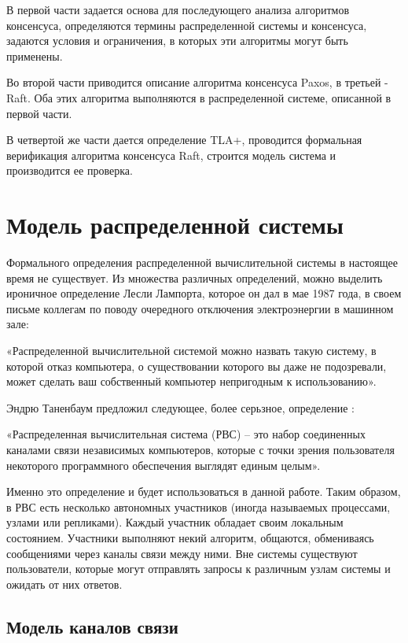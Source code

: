 
В первой части задается основа для последующего анализа алгоритмов консенсуса,
определяются термины распределенной системы и консенсуса, задаются условия и
ограничения, в которых эти алгоритмы могут быть применены.

Во второй части приводится описание алгоритма консенсуса Paxos, в третьей - Raft.
Оба этих алгоритма выполняются в распределенной системе, описанной в первой части.

В четвертой же части дается определение TLA+, проводится формальная верификация
алгоритма консенсуса Raft, строится модель система и производится ее проверка.

\section{Модель распределенной системы}

Формального определения распределенной вычислительной системы в настоящее время
не существует. Из множества различных определений, можно выделить ироничное
определение Лесли Лампорта, которое он дал в мае 1987 года,
в своем письме коллегам по поводу очередного отключения электроэнергии в машинном
зале:

«Распределенной вычислительной системой можно назвать такую систему, в которой
отказ компьютера, о существовании которого вы даже не подозревали, может сделать
ваш собственный компьютер непригодным к использованию».

Эндрю Таненбаум предложил следующее, более серьзное, определение
\cite{tanenbaum_distributed_systems}:

«Распределенная вычислительная система (РВС) – это набор соединенных каналами
связи независимых компьютеров, которые с точки зрения пользователя некоторого
программного обеспечения выглядят единым целым».

Именно это определение и будет использоваться в данной работе. Таким образом,
в РВС есть несколько автономных участников (иногда называемых процессами, узлами
или репликами). Каждый участник обладает своим локальным состоянием. Участники
выполняют некий алгоритм, общаются, обмениваясь сообщениями через каналы связи
между ними. Вне системы существуют пользователи, которые могут отправлять запросы
к различным узлам системы и ожидать от них ответов.

\subsection{Модель каналов связи}

